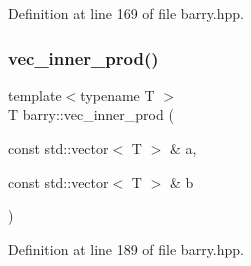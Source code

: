 Definition at line 169 of file barry.\+hpp.

\mbox{\label{namespacebarry_a0343fb4152724d5fa1ffa00d4b6182d9}} 
\subsubsection{\texorpdfstring{vec\+\_\+inner\+\_\+prod()}{vec\_inner\_prod()}}
{\footnotesize\ttfamily template$<$typename T $>$ \\
T barry\+::vec\+\_\+inner\+\_\+prod (\begin{DoxyParamCaption}\item[{const std\+::vector$<$ T $>$ \&}]{a,  }\item[{const std\+::vector$<$ T $>$ \&}]{b }\end{DoxyParamCaption})\hspace{0.3cm}{\ttfamily [inline]}}



Definition at line 189 of file barry.\+hpp.

